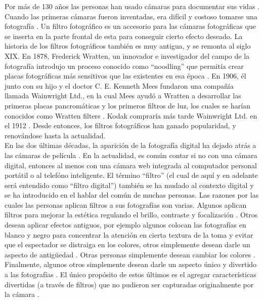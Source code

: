 \documentclass[a4paper,openright,12pt]{report}
\begin{document}
Por más de 130 años las personas han usado cámaras para documentar sus vidas
\cite{snap2017prospectus}.
Cuando las primeras cámaras fueron inventadas, era difícil y costoso tomarse una
fotografía \cite{snap2017prospectus}. Un filtro fotográfico es un accesorio para las
cámaras fotográficas que se inserta en la parte frontal de esta para conseguir
cierto efecto deseado. La historia de los filtros fotográficos también es muy
antigua, y se remonta al siglo XIX. En 1878, Frederick Wratten, un innovador e
investigador del campo de la fotografía introdujo un proceso conocido como
“noodling” que permitía crear placas fotográficas más sensitivos que las
existentes en esa época \cite{hannavy2013encyclopedia}⁠. En 1906, él junto con
su hijo y el doctor C. E. Kenneth
Mees fundaron una compañía llamada Wainwright Ltd., en la cual Mees ayudó a
Wratten a desarrollar las primeras placas pancromáticas y los primeros filtros
de luz, los cuales se harían conocidos como Wratten filters
\cite{hannavy2013encyclopedia}⁠. Kodak compraría
más tarde Wainwright Ltd. en el 1912 \cite{hannavy2013encyclopedia}⁠. Desde
entonces, los filtros fotográficos han ganado popularidad, y renovándose hasta
la actualidad.\\

En las dos últimas décadas, la aparición de la fotografía digital ha dejado
atrás a las cámaras de película \cite{CIPAfilmCameraStats}. En la actualidad,
es común contar si no con una cámara digital, entonces al menos con una cámara
web integrada al computador personal portátil o al telefóno inteligente. El
término “filtro” (el cual de aquí y en
adelante será entendido como “filtro digital”) también se ha mudado al contexto
digital y se ha introducido en el hablar del común de muchas personas. Las
razones por las cuales las personas aplican filtros a sus fotografías son
varias. Algunos aplican filtros para mejorar la estética regulando el brillo,
contraste y focalización \cite{bakhshi2015we}. Otros desean aplicar efectos
antiguos, por ejemplo algunos colocan las fotografías en blanco y negro para
concentrar la atención en cierta textura de la toma y evitar que el espectador
se distraiga en los colores, otros simplemente desean darle un aspecto de
antigüedad \cite{bakhshi2015we}. Otras personas simplemente desean cambiar los
colores \cite{bakhshi2015we}. Finalmente, algunos otros simplemente
desean darle un aspecto único y divertido a las fotografías
\cite{bakhshi2015we}. El único propósito de estos últimos es el agregar
características divertidas (a través de filtros) que no pudieron ser capturadas
originalmente por la cámara \cite{bakhshi2015we}.\\
\end{document}
